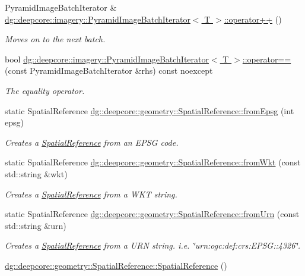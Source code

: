 \begin{DoxyCompactItemize}
Pyramid\+Image\+Batch\+Iterator \& \hyperlink{group___imagery_module_ga8a830889046c718cbfcb4067a33908f3}{dg\+::deepcore\+::imagery\+::\+Pyramid\+Image\+Batch\+Iterator$<$ T $>$\+::operator++} ()
\begin{DoxyCompactList}\small\item\em Moves on to the next batch. \end{DoxyCompactList}\item 
bool \hyperlink{group___imagery_module_ga6ebbb4ad321f8a6fff0423155a784e3c}{dg\+::deepcore\+::imagery\+::\+Pyramid\+Image\+Batch\+Iterator$<$ T $>$\+::operator==} (const Pyramid\+Image\+Batch\+Iterator \&rhs) const noexcept
\begin{DoxyCompactList}\small\item\em The equality operator. \end{DoxyCompactList}\item 
static Spatial\+Reference \hyperlink{group___imagery_module_ga4ef6ea29f2717ed5572522fe50b23d99}{dg\+::deepcore\+::geometry\+::\+Spatial\+Reference\+::from\+Epsg} (int epsg)
\begin{DoxyCompactList}\small\item\em Creates a \hyperlink{classdg_1_1deepcore_1_1geometry_1_1_spatial_reference}{Spatial\+Reference} from an E\+P\+SG code. \end{DoxyCompactList}\item 
static Spatial\+Reference \hyperlink{group___imagery_module_gaffb292540698074ced3a1dbe8ce7ba64}{dg\+::deepcore\+::geometry\+::\+Spatial\+Reference\+::from\+Wkt} (const std\+::string \&wkt)
\begin{DoxyCompactList}\small\item\em Creates a \hyperlink{classdg_1_1deepcore_1_1geometry_1_1_spatial_reference}{Spatial\+Reference} from a W\+KT string. \end{DoxyCompactList}\item 
static Spatial\+Reference \hyperlink{group___imagery_module_ga926f04f2b75c645a6fcd732c85de507f}{dg\+::deepcore\+::geometry\+::\+Spatial\+Reference\+::from\+Urn} (const std\+::string \&urn)
\begin{DoxyCompactList}\small\item\em Creates a \hyperlink{classdg_1_1deepcore_1_1geometry_1_1_spatial_reference}{Spatial\+Reference} from a U\+RN string. i.\+e. \char`\"{}urn\+:ogc\+:def\+:crs\+:\+E\+P\+S\+G\+::4326\char`\"{}. \end{DoxyCompactList}\item 
\hyperlink{group___imagery_module_ga00013f2d2c981a6c7182fb165818ef73}{dg\+::deepcore\+::geometry\+::\+Spatial\+Reference\+::\+Spatial\+Reference} ()

\end{DoxyCompactItemize}
